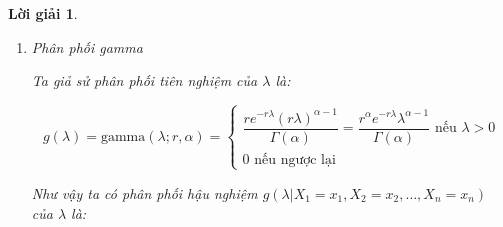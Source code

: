 \documentclass[14pt, a4paper]{article}
\theoremstyle{sltheorem}
\theoremstyle{soltheorem}
\newtheorem*{loigiai}{Lời giải}
\begin{document}
\begin{loigiai}
\begin{enumerate}
\begin{enumerate}[label=(\alph*)]
            \begin{equation*}
                \text{gamma}(\lambda; n, \alpha) = \begin{cases}
                    \dfrac{n e^{-n\lambda} (n\lambda)^{\alpha - 1}}{\Gamma(\alpha)} \text{ nếu } \lambda > 0 \\
                    0 \text{ nếu ngược lại}
                \end{cases}
            \end{equation*}

            Vì vậy:

            \begin{equation*}
                g(\lambda \vert X_1 =x_1, X_2=x_2, \dots, X_n=x_n) \propto \text{gamma}\big(\lambda; n, (\sum_{i=1}^n x_i) + 1\big)
            \end{equation*}

            \item Phân phối gamma
            
            Ta giả sử phân phối tiên nghiệm của $\lambda$ là:

            \begin{equation*}
                g(\lambda) = \text{gamma}(\lambda; r, \alpha) = \begin{cases}
                    \dfrac{r e^{-r\lambda} (r\lambda)^{\alpha - 1}}{\Gamma(\alpha)}=\dfrac{r^{\alpha}e^{-r\lambda} \lambda^{\alpha - 1}}{\Gamma(\alpha)} \text{ nếu } \lambda > 0 \\
                    0 \text{ nếu ngược lại}
                \end{cases}
            \end{equation*}

            Như vậy ta có phân phối hậu nghiệm $g(\lambda \vert X_1 =x_1, X_2=x_2, \dots, X_n=x_n)$ của $\lambda$ là:


\end{enumerate}
\end{enumerate}
\end{loigiai}
\end{document}
